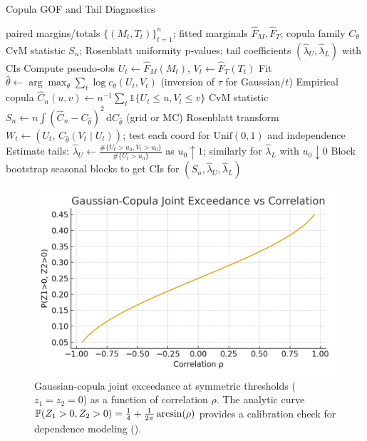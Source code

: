 \begin{algorithm}[t]
  \caption{Copula GOF and Tail Diagnostics}
  \label{alg:copula-gof}
  \begin{algorithmic}[1]
    \Require paired margins/totals $\{(M_t,T_t)\}_{t=1}^n$; fitted marginals $\hat F_M,\hat F_T$; copula family $C_\theta$
    \Ensure CvM statistic $S_n$; Rosenblatt uniformity p‑values; tail coefficients $(\hat\lambda_U,\hat\lambda_L)$ with CIs
    \State Compute pseudo‑obs $U_t\leftarrow\hat F_M(M_t)$, $V_t\leftarrow\hat F_T(T_t)$
    \State Fit $\hat\theta\leftarrow\arg\max_\theta\sum_t \log c_\theta(U_t,V_t)$ (inversion of $\tau$ for Gaussian/$t$)
    \State Empirical copula $\hat C_n(u,v)\leftarrow n^{-1}\sum_t\mathbb{1}\{U_t\le u,V_t\le v\}$
    \State CvM statistic $S_n\leftarrow n\int(\hat C_n-C_{\hat\theta})^2\,\mathrm d C_{\hat\theta}$ (grid or MC)
    \State Rosenblatt transform $W_t\leftarrow(U_t,\, C_{\hat\theta}(V_t\mid U_t))$; test each coord for $\mathrm{Unif}(0,1)$ and independence
    \State Estimate tails: $\hat\lambda_U\leftarrow\frac{\#\{U_t>u_0, V_t>u_0\}}{\#\{U_t>u_0\}}$ as $u_0\uparrow1$; similarly for $\hat\lambda_L$ with $u_0\downarrow0$
    \State Block bootstrap seasonal blocks to get CIs for $(S_n,\hat\lambda_U,\hat\lambda_L)$
  \end{algorithmic}
\end{algorithm}

\begin{figure}[t]
  \centering
  \includegraphics[width=0.9\linewidth]{../figures/joint_exceedance_vs_rho.png}
  \caption{Gaussian-copula joint exceedance at symmetric thresholds ($z_1=z_2=0$) as a function of correlation $\rho$. The analytic curve $\mathbb{P}(Z_1>0,Z_2>0)=\tfrac14+\tfrac{1}{2\pi}\arcsin(\rho)$ provides a calibration check for dependence modeling ().}
  \label{fig:copula-joint}
\end{figure}

